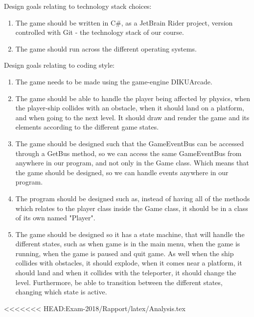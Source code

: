 \documentclass[../master.tex]{subfiles}
\begin{document}
Design goals relating to technology stack choices:
\begin{enumerate}
	\item The game should be written in C\#, as a JetBrain Rider project, version controlled with Git - the technology stack of our course.
	\item The game should run across the different operating systems. 
\end{enumerate}

Design goals relating to coding style:
\begin{enumerate}
	\item The game needs to be made using the game-engine DIKUArcade.
	\item The game should be able to handle the player being affected by physics, when the player-ship collides with an obstacle, when it should land on a platform, and when going to the next level. It should draw and render the game and its elements according to the different game states. 
	\item The game should be designed such that the GameEventBus can be accessed through a GetBus method, so we can access the same GameEventBus from anywhere in our program, and not only in the Game class. Which means that the game should be designed, so we can handle events anywhere in our program.
	\item The program should be designed such as, instead of having all of the methods which relates to the player class inside the Game class, it should be in a class of its own named "Player".
	\item The game should be designed so it has a state machine, that will handle the different states, such as when game is in the main menu, when the game is running, when the game is paused and quit game. As well when the ship collides with obstacles, it should explode, when it comes near a platform, it should land and when it collides with the teleporter, it should change the level. Furthermore, be able to transition between the different states, changing which state is active.
\end{enumerate}

<<<<<<< HEAD:Exam-2018/Rapport/latex/Analysis.tex
\end{document}
